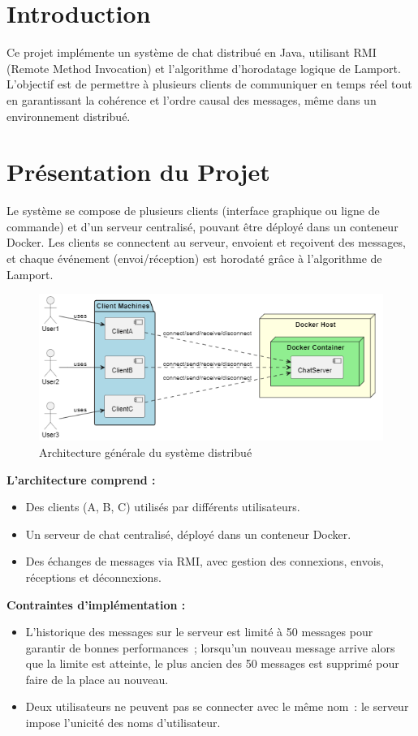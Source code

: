 \documentclass[a4paper,12pt]{article}
\begin{document}
\section{Introduction}
Ce projet implémente un système de chat distribué en Java, utilisant RMI (Remote Method Invocation) et l'algorithme d'horodatage logique de Lamport. L'objectif est de permettre à plusieurs clients de communiquer en temps réel tout en garantissant la cohérence et l'ordre causal des messages, même dans un environnement distribué.

\section{Présentation du Projet}
Le système se compose de plusieurs clients (interface graphique ou ligne de commande) et d'un serveur centralisé, pouvant être déployé dans un conteneur Docker. Les clients se connectent au serveur, envoient et reçoivent des messages, et chaque événement (envoi/réception) est horodaté grâce à l'algorithme de Lamport.

\begin{figure}[ht!]
    \centering
    \includegraphics[width=1\textwidth]{architecture.png}
    \caption{Architecture générale du système distribué}
\end{figure}

\textbf{L'architecture comprend :}
\begin{itemize}
    \item Des clients (A, B, C) utilisés par différents utilisateurs.
    \item Un serveur de chat centralisé, déployé dans un conteneur Docker.
    \item Des échanges de messages via RMI, avec gestion des connexions, envois, réceptions et déconnexions.
\end{itemize}

\textbf{Contraintes d'implémentation :}
\begin{itemize}
    \item L'historique des messages sur le serveur est limité à 50 messages pour garantir de bonnes performances~; lorsqu'un nouveau message arrive alors que la limite est atteinte, le plus ancien des 50 messages est supprimé pour faire de la place au nouveau.
    \item Deux utilisateurs ne peuvent pas se connecter avec le même nom~: le serveur impose l'unicité des noms d'utilisateur.
\end{itemize}
\end{document}
